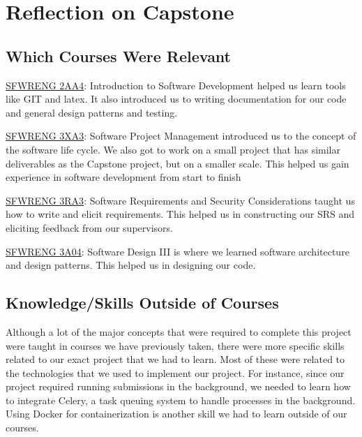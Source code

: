 \documentclass{article}
\begin{document}
\section{Reflection on Capstone}

\subsection{Which Courses Were Relevant}

\underline{SFWRENG 2AA4}: Introduction to Software Development helped us learn tools like GIT and latex. It also introduced us to writing documentation for our code and general design patterns and testing.

\noindent \underline{SFWRENG 3XA3}: Software Project Management introduced us to the concept of the software life cycle. We also got to work on a small project that has similar deliverables as the Capstone project, but on a smaller scale. This helped us gain experience in software development from start to finish

\noindent \underline{SFWRENG 3RA3}: Software Requirements and Security Considerations taught us how to write and elicit requirements. This helped us in constructing our SRS and eliciting feedback from our supervisors.

\noindent \underline{SFWRENG 3A04}: Software Design III is where we learned software architecture and design patterns. This helped us in designing our code.

\subsection{Knowledge/Skills Outside of Courses}

Although a lot of the major concepts that were required to complete this project were taught in courses we have previously taken, there were more specific skills related to our exact project that we had to learn. Most of these were related to the technologies that we used to implement our project. For instance, since our project required running submissions in the background, we needed to learn how to integrate Celery, a task queuing system to handle processes in the background. Using Docker for containerization is another skill we had to learn outside of our courses.
\end{document}
